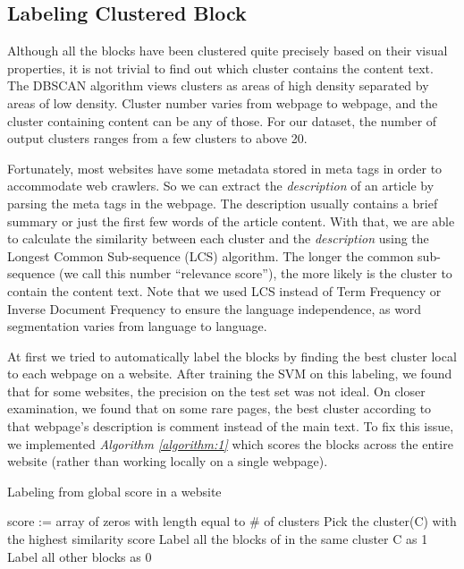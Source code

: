 \documentclass{acm_proc_article-sp}
\begin{document}
\subsection{Labeling Clustered Block}
Although all the blocks have been clustered quite precisely based on their visual properties, it is not trivial to find out which cluster contains the content text. The DBSCAN algorithm views clusters as areas of high density separated by areas of low density. Cluster number varies from webpage to webpage, and the cluster containing content can be any of those. For our dataset, the number of output clusters ranges from a few clusters to above 20.

Fortunately, most websites have some metadata stored in meta tags in order to accommodate web crawlers. So we can extract the \emph{description} of an article by parsing the meta tags in the webpage. The description usually contains a brief summary or just the first few words of the article content. With that, we are able to calculate the similarity between each cluster and the \emph{description} using the Longest Common Sub-sequence (LCS) algorithm. The longer the common sub-sequence (we call this number ``relevance score''), the more likely is the cluster to contain the content text. Note that we used LCS instead of Term Frequency or Inverse Document Frequency to ensure the language independence, as word segmentation varies from language to language.

At first we tried to automatically label the blocks by finding the best cluster local to each webpage on a website. After training the SVM on this labeling, we found that for some websites, the precision on the test set was not ideal. On closer examination, we found that on some rare pages, the best cluster according to that webpage's description is comment instead of the main text. To fix this issue, we implemented \emph{Algorithm \ref{algorithm:1}} which scores the blocks across the entire website (rather than working locally on a single webpage).

\begin{algorithm}
\caption{\label{algorithm:1}Labeling from global score in a website}
 score := {array of zeros with length equal to \# of clusters}\;
 Pick the cluster(C) with the highest similarity score\;
 Label all the blocks of in the same cluster C as 1\;
 Label all other blocks as 0\;

\end{algorithm}
\end{document}
